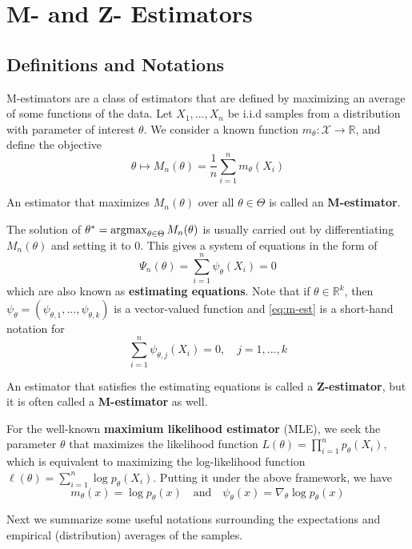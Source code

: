 \documentclass{article}
\begin{document}

\setcounter{section}{4}
\section{M- and Z- Estimators}
\subsection{Definitions and Notations}
M-estimators are a class of estimators that are defined by maximizing an average of some functions of the data. Let $X_1, ..., X_n$ be i.i.d samples from a distribution with parameter of interest $\theta$. We consider a known function $m_\theta:\mathcal{X} \to \mathbb{R}$, and define the objective
\begin{equation}
    \theta \mapsto M_n(\theta) = \frac{1}{n} \sum_{i=1}^{n} m_\theta(X_i)
\end{equation} 
\begin{definition}
    An estimator that maximizes $M_n(\theta)$ over all $\theta \in \Theta$ is called an \textbf{M-estimator}.
\end{definition}
The solution of $\theta^* = \mathop{\mathrm{argmax}}_{\theta \in \Theta} M_n(\theta)$ is usually carried out by differentiating $M_n(\theta)$ and setting it to 0. This gives a system of equations in the form of 
\begin{equation}\label{eq:m-est}
    \Psi_n(\theta) = \sum_{i=1}^{n} \psi_\theta(X_i) = 0
\end{equation}
which are also known as \textbf{estimating equations}. Note that if $\theta \in \mathbb{R}^k$, then $\psi_\theta = (\psi_{\theta, 1}, ..., \psi_{\theta, k})$ is a vector-valued function and \ref{eq:m-est} is a short-hand notation for
\begin{equation}
    \sum_{i=1}^{n} \psi_{\theta, j}(X_i) = 0, \quad  j = 1, ..., k
\end{equation}
\begin{definition}
    An estimator that satisfies the estimating equations is called a \textbf{Z-estimator}, but it is often called a \textbf{M-estimator} as well.
\end{definition}
\begin{example}
    For the well-known \textbf{maximium likelihood estimator} (MLE), we seek the parameter $\theta$ that maximizes the likelihood function $L(\theta) = \prod_{i=1}^{n} p_\theta(X_i)$, which is equivalent to maximizing the log-likelihood function $\ell(\theta) = \sum_{i=1}^{n} \log p_\theta(X_i)$. Putting it under the above framework, we have 
    \begin{equation*}
        m_\theta(x) = \log p_\theta(x) \quad \text{and} \quad \psi_\theta(x) = \nabla_\theta \log p_\theta(x)
    \end{equation*}
\end{example}
Next we summarize some useful notations surrounding the expectations and empirical (distribution) averages of the samples.
\end{document}
